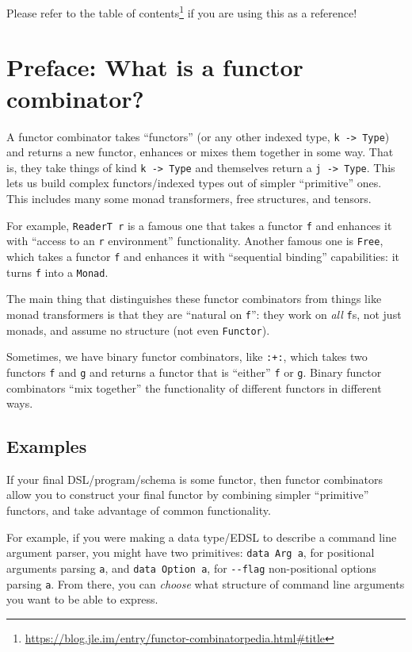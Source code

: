 \documentclass[]{article}
\renewcommand{\href}[2]{#2\footnote{\url{#1}}}
\begin{document}
Please refer to the
\href{https://blog.jle.im/entry/functor-combinatorpedia.html\#title}{table of
contents} if you are using this as a reference!

\hypertarget{preface-what-is-a-functor-combinator}{%
\section{Preface: What is a functor
combinator?}\label{preface-what-is-a-functor-combinator}}

A functor combinator takes ``functors'' (or any other indexed type,
\texttt{k\ -\textgreater{}\ Type}) and returns a new functor, enhances or mixes
them together in some way. That is, they take things of kind
\texttt{k\ -\textgreater{}\ Type} and themselves return a
\texttt{j\ -\textgreater{}\ Type}. This lets us build complex functors/indexed
types out of simpler ``primitive'' ones. This includes many some monad
transformers, free structures, and tensors.

For example, \texttt{ReaderT\ r} is a famous one that takes a functor \texttt{f}
and enhances it with ``access to an \texttt{r} environment'' functionality.
Another famous one is \texttt{Free}, which takes a functor \texttt{f} and
enhances it with ``sequential binding'' capabilities: it turns \texttt{f} into a
\texttt{Monad}.

The main thing that distinguishes these functor combinators from things like
monad transformers is that they are ``natural on \texttt{f}'': they work on
\emph{all} \texttt{f}s, not just monads, and assume no structure (not even
\texttt{Functor}).

Sometimes, we have binary functor combinators, like \texttt{:+:}, which takes
two functors \texttt{f} and \texttt{g} and returns a functor that is ``either''
\texttt{f} or \texttt{g}. Binary functor combinators ``mix together'' the
functionality of different functors in different ways.

\hypertarget{examples}{%
\subsection{Examples}\label{examples}}

If your final DSL/program/schema is some functor, then functor combinators allow
you to construct your final functor by combining simpler ``primitive'' functors,
and take advantage of common functionality.

For example, if you were making a data type/EDSL to describe a command line
argument parser, you might have two primitives: \texttt{data\ Arg\ a}, for
positional arguments parsing \texttt{a}, and \texttt{data\ Option\ a}, for
\texttt{-\/-flag} non-positional options parsing \texttt{a}. From there, you can
\emph{choose} what structure of command line arguments you want to be able to
express.
\end{document}
